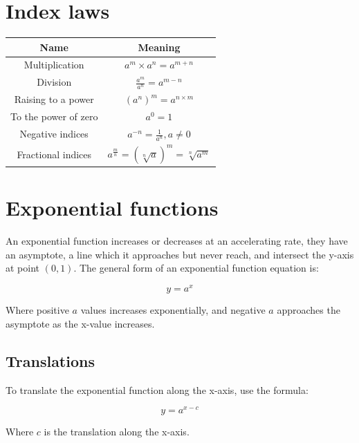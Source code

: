 \documentclass{book}
\begin{document}


\chapter{Index laws}
\begin{center}
	\begin{tabular}{c|c}
		Name                 & Meaning                                             \\ \hline
		Multiplication       & $a^m \times a^n = a^{m + n}$                        \\
		Division             & $\frac{a^m}{a^n} = a^{m - n}$                       \\
		Raising to a power   & $(a^n)^m = a^{n \times m}$                          \\
		To the power of zero & $a^0 = 1$                                           \\
		Negative indices     & $a^{-n} = \frac{1}{a^n}, a \not = 0$                \\
		Fractional indices   & $a^{\frac{m}{n}} = (\sqrt[n]{a})^m = \sqrt[n]{a^m}$
	\end{tabular}
\end{center}




\chapter{Exponential functions}
An exponential function increases or decreases at an accelerating rate, they have an asymptote, a line which it approaches but never reach, and intersect the y-axis at point $(0, 1)$.  The general form of an exponential function equation is:

\[
	y = a^x
\]

Where positive $a$ values increases exponentially, and negative $a$ approaches the asymptote as the x-value increases.



\section{Translations}
To translate the exponential function along the x-axis, use the formula:

\[
	y = a^{x - c}
\]

Where $c$ is the translation along the x-axis.
\end{document}

